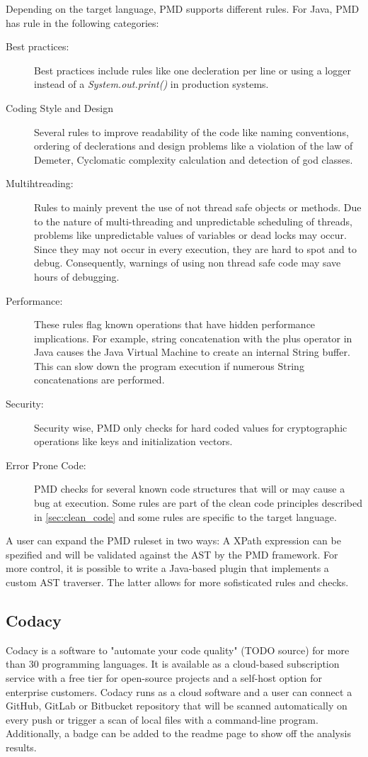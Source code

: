 Depending on the target language, PMD supports different rules. For Java, PMD has rule in the following categories:
\begin{description}
    \item[Best practices:] Best practices include rules like one decleration per line or using a logger instead of a \textit{System.out.print()} in production systems.  
    \item[Coding Style and Design] Several rules to improve readability of the code like naming conventions, ordering of declerations and design problems like a violation of the law of Demeter, Cyclomatic complexity calculation and detection of god classes.
    \item[Multihtreading: ]  Rules to mainly prevent the use of not thread safe objects or methods. Due to the nature of multi-threading and unpredictable scheduling of threads, problems like unpredictable values of variables or dead locks may occur. Since they may not occur in every execution, they are hard to spot and to debug. Consequently, warnings of using non thread safe code may save hours of debugging.
    \item[Performance: ] These rules flag known operations that have hidden performance implications. For example, string concatenation with the plus operator in Java causes the Java Virtual Machine to create an internal String buffer. This can slow down the program execution if numerous String concatenations are performed.
    \item[Security:] Security wise, PMD only checks for hard coded values for cryptographic operations like keys and initialization vectors.
    \item[Error Prone Code: ] PMD checks for several known code structures that will or may cause a bug at execution. Some rules are part of the clean code principles described in \ref{sec:clean_code} and some rules are specific to the target language.
\end{description}

A user can expand the PMD ruleset in two ways: A XPath expression can be spezified and will be validated against the AST by the PMD framework. For more control, it is possible to write a Java-based plugin that implements a custom AST traverser. The latter allows for more sofisticated rules and checks.

\subsection{Codacy}
Codacy is a software to "automate your code quality" (TODO source) for more than 30 programming languages. It is available as a cloud-based subscription service with a free tier for open-source projects and a self-host option for enterprise customers.  Codacy runs as a cloud software and a user can connect a GitHub, GitLab or Bitbucket repository that will be scanned automatically on every push or trigger a scan of local files with a command-line program. Additionally, a badge can be added to the readme page to show off the analysis results.

